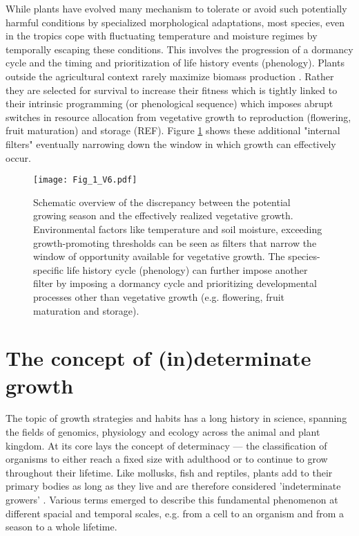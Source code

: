 \documentclass{article}
\begin{document}
		While plants have evolved many mechanism to tolerate or avoid such potentially harmful conditions by specialized morphological adaptations, most species, even in the tropics cope with fluctuating temperature and moisture regimes by temporally escaping these conditions. This involves the progression of a dormancy cycle and the timing and prioritization of life history events (phenology). Plants outside the agricultural context rarely maximize biomass production \citep{kornerConceptsEmpiricalPlant2018}. Rather they are selected for survival to increase their fitness which is tightly linked to their intrinsic programming (or phenological sequence) which imposes abrupt switches in resource allocation from vegetative growth to reproduction (flowering, fruit maturation) and storage (REF). Figure \ref{fig:fig_1xxx} shows these additional "internal filters" eventually narrowing down the window in which growth can effectively occur.\\
		
		

								\begin{figure}
								\centering
								\texttt{[image: Fig\_1\_V6.pdf]} 
								\caption{Schematic overview of the discrepancy between the potential growing season and the effectively realized vegetative growth. Environmental factors like temperature and soil moisture, exceeding growth-promoting thresholds can be seen as filters that narrow the window of opportunity available for vegetative growth. The species-specific life history cycle (phenology) can further impose another filter by imposing a dormancy cycle and prioritizing developmental processes other than vegetative growth (e.g. flowering, fruit maturation and storage). }
								\label{fig:fig_1xxx}
							\end{figure}

	
\section*{The concept of (in)determinate growth}
The topic of growth strategies and habits has a long history in science, spanning the fields of genomics, physiology and ecology across the animal and plant kingdom. At its core lays the concept of determinacy --- the classification of organisms to either reach a fixed size with adulthood or to continue to grow throughout their lifetime. Like mollusks, fish and reptiles, plants add to their primary bodies as long as they live and are therefore considered 'indeterminate growers' \citep{ejsmondHowTimeGrowth2010}. Various terms emerged to describe this fundamental phenomenon at different spacial and temporal scales, e.g. from a cell to an organism and from a season to a whole lifetime. \\
\end{document}
